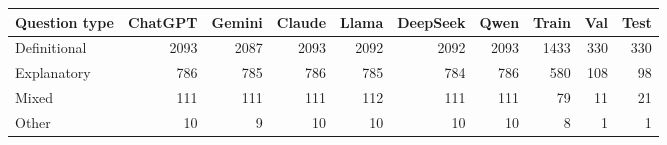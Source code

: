 \begin{tabular}{lrrrrrr|rrr}
\toprule
Question type & ChatGPT & Gemini & Claude & Llama & DeepSeek & Qwen & Train & Val & Test \\
\midrule
Definitional & 2093 & 2087 & 2093 & 2092 & 2092 & 2093 & 1433 & 330 & 330 \\
Explanatory & 786 & 785 & 786 & 785 & 784 & 786 & 580 & 108 & 98 \\
Mixed & 111 & 111 & 111 & 112 & 111 & 111 & 79 & 11 & 21 \\
Other & 10 & 9 & 10 & 10 & 10 & 10 & 8 & 1 & 1 \\
\bottomrule
\end{tabular}
